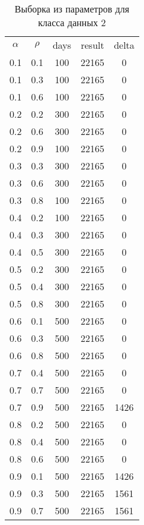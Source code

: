 \begin{center}
	\label{table_kd2}
	\begin{longtable}[c]{|c|c|c|c|c|}
		\captionsetup{justification=raggedright,singlelinecheck=off}
		\caption{Выборка из параметров для класса данных 2}\\
		\hline		
		$\alpha$ & $\rho$ & days & result & delta \\ \hline
		0.1 & 0.1 & 100 & 22165 & 0 \\
		0.1 & 0.3 & 100 & 22165 & 0 \\
		0.1 & 0.6 & 100 & 22165 & 0 \\ \hline
		0.2 & 0.2 & 300 & 22165 & 0 \\
		0.2 & 0.6 & 300 & 22165 & 0 \\
		0.2 & 0.9 & 100 & 22165 & 0 \\ \hline
		0.3 & 0.3 & 300 & 22165 & 0\\
		0.3 & 0.6 & 300 & 22165 & 0 \\
		0.3 & 0.8 & 100 & 22165 & 0 \\ \hline
		0.4 & 0.2 & 100 & 22165 & 0 \\
		0.4 & 0.3 & 300 & 22165 & 0 \\
		0.4 & 0.5 & 300 & 22165 & 0 \\ \hline
		0.5 & 0.2 & 300 & 22165 & 0 \\
		0.5 & 0.4 & 300 & 22165 & 0 \\
		0.5 & 0.8 & 300 & 22165 & 0 \\ \hline
		0.6 & 0.1 & 500 & 22165 & 0 \\
		0.6 & 0.3 & 500 & 22165 & 0 \\
		0.6 & 0.8 & 500 & 22165 & 0 \\ \hline
		0.7 & 0.4 & 500 & 22165 & 0 \\
		0.7 & 0.7 & 500 & 22165 & 0 \\
		0.7 & 0.9 & 500 & 22165 & 1426 \\ \hline
		0.8 & 0.2 & 500 & 22165 & 0 \\
		0.8 & 0.4 & 500 & 22165 & 0 \\
		0.8 & 0.6 & 500 & 22165 & 0 \\ \hline
		0.9 & 0.1 & 500 & 22165 & 1426 \\
		0.9 & 0.3 & 500 & 22165 & 1561 \\
		0.9 & 0.7 & 500 & 22165 & 1561 \\ \hline
	\end{longtable}
\end{center}

